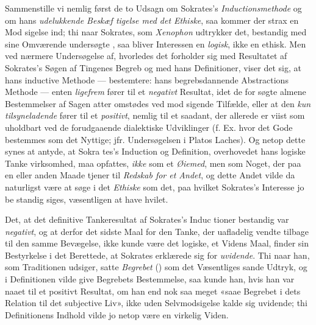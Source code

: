 Sammenstille vi nemlig først de to Udsagn om Sokrates's
\emph{Inductionsmethode} og om hans \emph{udelukkende Beskæf\-%
tigelse med det Ethiske}, saa kommer der strax en Mod\-%
sigelse ind; thi naar Sokrates, som \emph{Xenophon} udtrykker det,
bestandig med sine Omværende undersøgte , saa bliver Interessen en \emph{logisk}, ikke en ethisk. Men
ved nærmere Undersøgelse af, hvorledes det forholder sig med
Resultatet af Sokrates's Søgen af Tingenes Begreb og med
hans Definitioner, viser det sig, at hans inductive Methode ---
bestemtere: hans begrebsdannende Abstractions Methode ---
enten \emph{ligefrem} fører til et \emph{negativt} Resultat, idet de for\-%
søgte almene Bestemmelser af Sagen atter omstødes ved mod\-%
sigende Tilfælde, eller at den \emph{kun tilsyneladende} fører til
et \emph{positivt}, nemlig til et saadant, der allerede er viist som
uholdbart ved de forudgaaende dialektiske Udviklinger (f. Ex.
hvor det Gode bestemmes som det Nyttige; jfr. Undersøgelsen
i Platos Laches). Og netop dette synes at antyde, at Sokra\-%
tes's Induction og Definition, overhovedet hans logiske Tanke\-%
virksomhed, maa opfattes, \emph{ikke} som et \emph{Øiemed}, men som
Noget, der paa en eller anden Maade tjener til \emph{Redskab for
et Andet}, og dette Andet vilde da naturligst være at søge i
det \emph{Ethiske} som det, paa hvilket Sokrates's Interesse jo be\-%
standig siges, væsentligen at have hvilet.

Det, at det definitive Tankeresultat af Sokrates's Induc\-%
tioner bestandig var \emph{negativt}, og at derfor det sidste Maal
for den Tanke, der uafladelig vendte tilbage til den samme
Bevægelse, ikke kunde være det logiske, et Videns Maal, finder
sin Bestyrkelse i det Berettede, at Sokrates erklærede sig for
\emph{uvidende}. Thi naar han, som Traditionen udsiger, satte
\emph{Begrebet} () som det Væsentliges sande Udtryk, og i
Definitionen vilde give Begrebets Bestemmelse, saa kunde han,
hvis han var naaet til et positivt Resultat, om han end nok
saa meget «saae Begrebet i dets Relation til det subjective Liv»,
ikke uden Selvmodsigelse kalde sig uvidende; thi Definitionens
Indhold vilde jo netop være en virkelig Viden.

